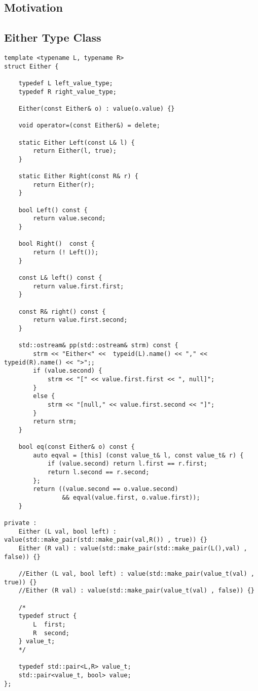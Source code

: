 \documentclass[12pt,fleqn]{article}
\begin{document}
\subsection{Motivation}
%

\subsection{Either Type Class}
%

%
%
\begin{minipage}{\linewidth}
\begin{lstlisting}[caption=Either type class,label=either]
template <typename L, typename R>
struct Either {

	typedef L left_value_type;
	typedef R right_value_type;

	Either(const Either& o) : value(o.value) {}

	void operator=(const Either&) = delete;

	static Either Left(const L& l) {
		return Either(l, true);
	}

	static Either Right(const R& r) {
		return Either(r);
	}

	bool Left() const {
		return value.second;
	}

	bool Right()  const {
		return (! Left());
	}

	const L& left() const {
		return value.first.first;
	}

	const R& right() const {
		return value.first.second;
	}

 	std::ostream& pp(std::ostream& strm) const {
		strm << "Either<" <<  typeid(L).name() << "," << typeid(R).name() << ">";;
		if (value.second) {
			strm << "[" << value.first.first << ", null]";
		}
		else {
			strm << "[null," << value.first.second << "]"; 
		}
		return strm;
	}

	bool eq(const Either& o) const {
		auto eqval = [this] (const value_t& l, const value_t& r) {
			if (value.second) return l.first == r.first;
			return l.second == r.second;
		};
		return ((value.second == o.value.second)
				&& eqval(value.first, o.value.first));
	}

private :
	Either (L val, bool left) : value(std::make_pair(std::make_pair(val,R()) , true)) {}
	Either (R val) : value(std::make_pair(std::make_pair(L(),val) , false)) {}

	//Either (L val, bool left) : value(std::make_pair(value_t(val) , true)) {}
	//Either (R val) : value(std::make_pair(value_t(val) , false)) {}

	/*
	typedef struct {
		L  first;
		R  second;
	} value_t;
	*/
	
	typedef std::pair<L,R> value_t;
	std::pair<value_t, bool> value;
};

\end{lstlisting}
\end{minipage}
%
%
%
\end{document}
